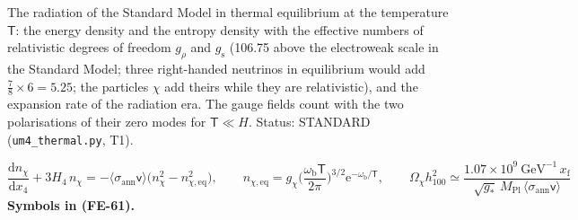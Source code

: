 \documentclass[
  10pt,
]{article}
\begin{document}
The radiation of the Standard Model in thermal equilibrium at the
temperature \(\mathsf{T}\): the energy density and the entropy density
with the effective numbers of relativistic degrees of freedom \(g_\rho\)
and \(g_{\mathrm{s}}\) (106.75 above the electroweak scale in the
Standard Model; three right-handed neutrinos in equilibrium would add
\(\frac78\times6 = 5.25\); the particles \(\chi\) add theirs while they
are relativistic), and the expansion rate of the radiation era. The
gauge fields count with the two polarisations of their zero modes for
\(\mathsf{T} \ll H\). Status: STANDARD (\texttt{um4\_thermal.py}, T1).

\[
\frac{\mathrm{d}n_\chi}{\mathrm{d}x_4} + 3H_4\,n_\chi = -\langle\sigma_{\mathrm{ann}}\mathsf{v}\rangle\big(n_\chi^2 - n_{\chi,\mathrm{eq}}^2\big),\qquad
n_{\chi,\mathrm{eq}} = g_\chi\Big(\frac{\omega_{\mathrm{b}}\mathsf{T}}{2\pi}\Big)^{3/2}\mathrm{e}^{-\omega_{\mathrm{b}}/\mathsf{T}},\qquad
\Omega_\chi h_{100}^2 \simeq \frac{1.07\times10^9\ \text{GeV}^{-1}\,x_{\mathrm{f}}}{\sqrt{g_*}\,M_{\mathrm{Pl}}\,\langle\sigma_{\mathrm{ann}}\mathsf{v}\rangle} \tag{FE-61}
\] \textbf{Symbols in (FE-61).}
\end{document}
